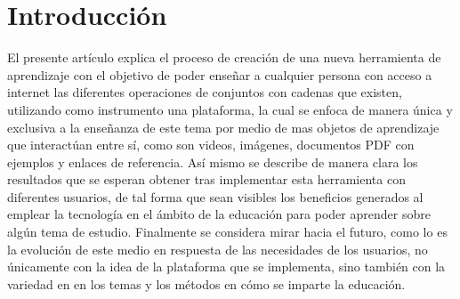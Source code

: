 \documentclass{llncs}
\begin{document}
\section{Introducción}
%
El presente artículo explica el proceso de creación de una nueva herramienta de aprendizaje con el objetivo de poder enseñar a cualquier persona con acceso a internet las diferentes operaciones de conjuntos con cadenas que existen, utilizando como instrumento una plataforma, la cual se enfoca de manera única y exclusiva a la enseñanza de este tema por medio de mas objetos de aprendizaje que interactúan entre sí, como son videos, imágenes, documentos PDF con ejemplos y enlaces de referencia. Así mismo se describe de manera clara los resultados que se esperan obtener tras implementar esta herramienta con diferentes usuarios, de tal forma que sean visibles los beneficios generados al emplear la tecnología en el ámbito de la educación  para poder aprender sobre algún tema de estudio.
Finalmente se considera mirar hacia el futuro, como lo es la evolución de este medio en respuesta de las necesidades de los usuarios, no únicamente con la idea de la plataforma que se implementa, sino también con la variedad en en los temas y los métodos en cómo se imparte la educación.

%
\end{document}
